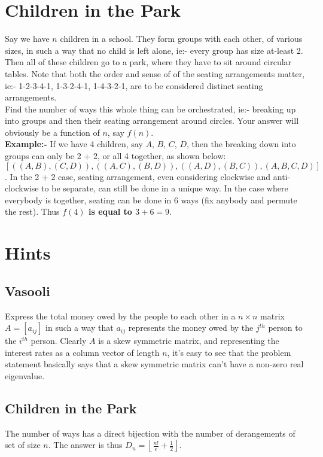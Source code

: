 \documentclass{article}
\begin{document}
\section{Children in the Park}
Say we have $n$ children in a school. They form groups with each other, of various sizes, in such a way that no child is left alone, ie:- every group has size at-least 2. Then all of these children go to a park, where they have to sit around circular tables. Note that both the order and sense of of the seating arrangements matter, ie:- 1-2-3-4-1, 1-3-2-4-1, 1-4-3-2-1, are to be considered distinct seating arrangements.\\
Find the number of ways this whole thing can be orchestrated, ie:- breaking up into groups and then their seating arrangement around circles. Your answer will obviously be a function of $n$, say $f(n)$.\\
\textbf{Example:-} If we have 4 children, say $A$, $B$, $C$, $D$, then the breaking down into groups can only be 2 + 2, or all 4 together, as shown below:\\ $[((A,B),(C,D)),((A,C),(B,D)),((A,D),(B,C)),(A,B,C,D)]$. In the 2 + 2 case, seating arrangement, even considering clockwise and anti-clockwise to be separate, can still be done in a unique way. In the case where everybody is together, seating can be done in 6 ways (fix anybody and permute the rest). Thus \textbf{$f(4)$ is equal to $3 + 6 = 9$}.


\section{Hints}
\subsection{Vasooli}
Express the total money owed by the people to each other in a $n \times n$ matrix $A = [a_{ij}]$ in such a way that $a_{ij}$ represents the money owed by the $j^{th}$ person to the $i^{th}$ person. Clearly $A$ is a skew symmetric matrix, and representing the interest rates as a column vector of length $n$, it's easy to see that the problem statement basically says that a skew symmetric matrix can't have a non-zero real eigenvalue.
\subsection{Children in the Park}
The number of ways has a direct bijection with the number of derangements of set of size $n$. The answer is thus $D_{n} = \left \lfloor {\frac{n!}{e}+\frac{1}{2}}\right \rfloor$.























%
\end{document}
